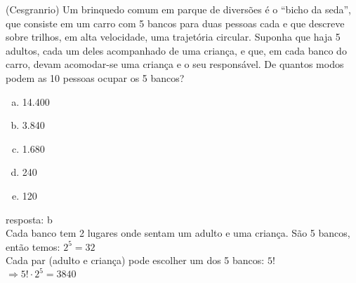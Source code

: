 \begin{ex}
 (Cesgranrio) Um brinquedo comum em parque de diversões é o “bicho da seda”, que consiste em um carro com 5 bancos para duas pessoas cada e que descreve sobre trilhos, em alta velocidade, uma trajetória circular. Suponha que haja 5 adultos, cada um deles acompanhado de uma criança, e que, em cada banco do carro, devam acomodar-se uma criança e o seu responsável. De quantos modos podem as 10 pessoas ocupar os 5 bancos? 
    \begin{enumerate}[(a)]
    \item 14.400
    \item 3.840
    \item 1.680
    \item 240
    \item 120
    \end{enumerate}
      \begin{sol}
       resposta: b \\
       Cada banco tem 2 lugares onde sentam um adulto e uma criança. São 5  bancos, então temos: $2^5=32$ \\
       Cada par (adulto e criança) pode escolher um dos 5 bancos: $5!$ \\
       $\Longrightarrow5!\cdot2^5= 3840$
      \end{sol}
\end{ex}